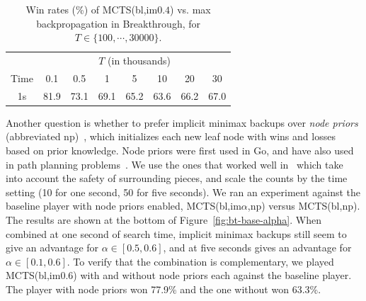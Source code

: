 \documentclass[conference]{IEEEtran}
\begin{document}
\begin{table}[t]
\begin{center}
\begin{tabular}{|c|ccccccc|}
\hline
                     & \multicolumn{7}{|c|}{$T$ (in thousands)}             \\
Time                & 0.1  & 0.5  & 1    & 5    & 10   & 20 & 30 \\
\hline
1s                 & 81.9 & 73.1 & 69.1 & 65.2 & 63.6 & 66.2 & 67.0 \\
\hline
\end{tabular}
\end{center}
\caption{Win rates (\%) of MCTS(bl,im$0.4$) vs. max backpropagation in Breakthrough, 
for $T \in \{ 100, \cdots, 30000 \}$. }
\label{tbl:maxbackprop}
\end{table}

Another question is whether to prefer implicit minimax backups over {\it node priors} (abbreviated np)~\cite{Gelly07Combining}, 
which initializes each new leaf node with wins and losses based on prior knowledge. Node priors were first used in Go, 
and have also used in path planning problems~\cite{Eyerich10High}.
We use the ones that worked well in~\cite{Lorentz13Breakthrough}
which take into account the safety of surrounding pieces, and scale the counts by the 
time setting (10 for one second, 50 for five seconds).
We ran an experiment against the baseline player with node priors enabled,
MCTS(bl,im$\alpha$,np) versus MCTS(bl,np). 
The results are shown at the bottom of Figure~\ref{fig:bt-base-alpha}. When combined at one second of 
search time, implicit minimax backups still seem to give an advantage for $\alpha \in [0.5,0.6]$, and at five 
seconds gives an advantage for $\alpha \in [0.1,0.6]$. To verify that the combination is complementary,
we played MCTS(bl,im$0.6$) with and without node priors each against the baseline player. The player with
node priors won 77.9\% and the one without won 63.3\%. 


\end{document}
